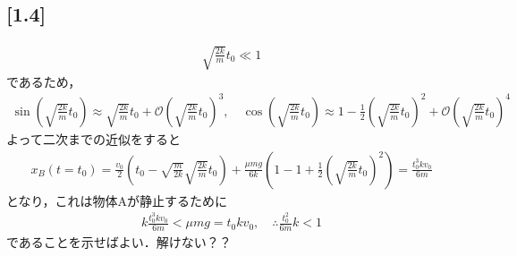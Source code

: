 \documentclass[12pt,dvipdfmx]{jsarticle}
\begin{document}
\subsection*{\large{[1.4]}}
\begin{eqnarray}
  \sqrt{\frac{2k}{m}}t_0 \ll 1
\end{eqnarray}
であるため，
\begin{eqnarray}
  \sin\left( \sqrt{\frac{2k}{m}}t_0 \right) \approx \sqrt{\frac{2k}{m}}t_0 + \mathcal{O}\left( \sqrt{\frac{2k}{m}}t_0 \right)^3, \quad \cos\left( \sqrt{\frac{2k}{m}}t_0 \right) \approx 1 -\frac{1}{2}\left( \sqrt{\frac{2k}{m}}t_0 \right)^2  + \mathcal{O}\left( \sqrt{\frac{2k}{m}}t_0 \right)^4
\end{eqnarray}
よって二次までの近似をすると
\begin{eqnarray}
  x_B(t=t_0) = \frac{v_0}{2}\left( t_0 - \sqrt{\frac{m}{2k}}\sqrt{\frac{2k}{m}}t_0 \right) + \frac{\mu mg}{6k}\left( 1 -1 + \frac{1}{2}\left( \sqrt{\frac{2k}{m}}t_0 \right)^2 \right) =\frac{t_0^3 kv_0}{6m}
\end{eqnarray}
となり，これは物体Aが静止するために
\begin{eqnarray}
  k\frac{t_0^3 kv_0}{6m} < \mu mg = t_0 k v_0 ,\quad\therefore \frac{t_0^2}{6m}k<1
\end{eqnarray}
であることを示せばよい．解けない？？
\end{document}
